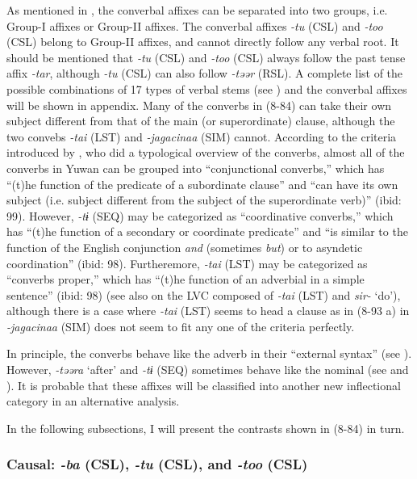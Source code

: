 As mentioned in , the converbal affixes can be separated into two groups, i.e. Group-I affixes or Group-II affixes. The converbal affixes \textit{{}-tu} (CSL) and \textit{{}-too} (CSL) belong to Group-II affixes, and cannot directly follow any verbal root. It should be mentioned that \textit{{}-tu} (CSL) and \textit{{}-too} (CSL) always follow the past tense affix \textit{{}-tar}, although \textit{{}-tu} (CSL) can also follow \textit{{}-təər} (RSL). A complete list of the possible combinations of 17 types of verbal stems (see ) and the converbal affixes will be shown in appendix. Many of the converbs in (8-84) can take their own subject different from that of the main (or superordinate) clause, although the two convebs \textit{{}-tai} (LST) and \textit{{}-jagacinaa} (SIM) cannot. According to the criteria introduced by \citet[98-99]{Nedjalkov1995}, who did a typological overview of the converbs, almost all of the converbs in Yuwan can be grouped into “conjunctional converbs,” which has “(t)he function of the predicate of a subordinate clause” and “can have its own subject (i.e. subject different from the subject of the superordinate verb)” (ibid: 99). However, \textit{{}-tɨ} (SEQ) may be categorized as “coordinative converbs,” which has “(t)he function of a secondary or coordinate predicate” and “is similar to the function of the English conjunction \textit{and} (sometimes \textit{but}) or to asyndetic coordination” (ibid: 98). Furtheremore, \textit{{}-tai} (LST) may be categorized as “converbs proper,” which has “(t)he function of an adverbial in a simple sentence” (ibid: 98) (see also  on the LVC composed of \textit{{}-tai} (LST) and \textit{sir-} ‘do’), although there is a case where \textit{{}-tai} (LST) seems to head a clause as in (8-93 a) in  \textit{{}-jagacinaa} (SIM) does not seem to fit any one of the criteria perfectly.

  In principle, the converbs behave like the adverb in their “external syntax” (see ). However, \textit{{}-təəra} ‘after’ and \textit{{}-tɨ} (SEQ) sometimes behave like the nominal (see  and ). It is probable that these affixes will be classified into another new inflectional category in an alternative analysis.

In the following subsections, I will present the contrasts shown in (8-84) in turn.

\subsubsection{Causal: \textit{{}-ba} (CSL), \textit{{}-tu} (CSL), and \textit{{}-too} (CSL)}

